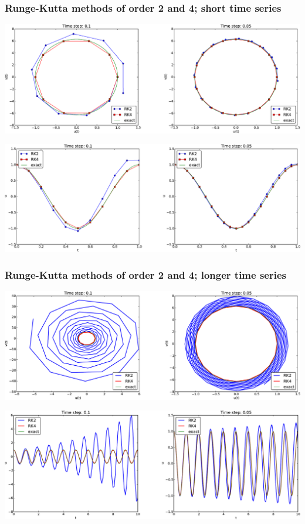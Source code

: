 \documentclass{beamer}
\begin{document}
\begin{frame}
\frametitle{Runge-Kutta methods of order 2 and 4; short time series}

\centerline{\includegraphics[width=1.0\linewidth]{fig-vib/vib_RK_1_pp.pdf}}





\centerline{\includegraphics[width=1.0\linewidth]{fig-vib/vib_RK_1_u.pdf}}
\end{frame}

\begin{frame}
\frametitle{Runge-Kutta methods of order 2 and 4; longer time series}

\centerline{\includegraphics[width=1.0\linewidth]{fig-vib/vib_RK_10_pp.pdf}}





\centerline{\includegraphics[width=1.0\linewidth]{fig-vib/vib_RK_10_u.pdf}}
\end{frame}
\end{document}
